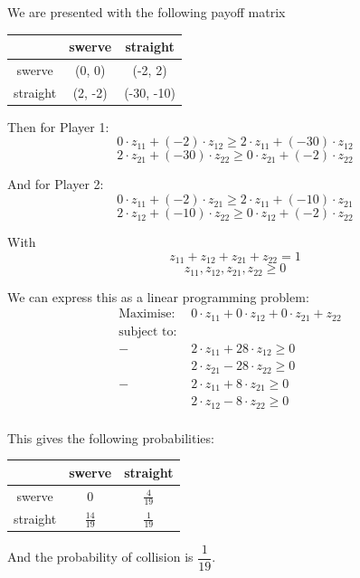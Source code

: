 \documentclass[11pt,journal]{article}
\begin{document}
	We are presented with the following payoff matrix
	\begin{table}[h]
		\centering
		\begin{tabular}{c|c|c|}
			
			& swerve & straight \\
			\hline
			swerve &(0, 0) & (-2, 2) \\
			\hline
			straight & (2, -2) & (-30, -10) \\
			\hline
		\end{tabular}
	\end{table}
	
	Then for Player 1:
	\[0 \cdot z_{11} + (-2)\cdot z_{12} \geq 2\cdot z_{11} + (-30) \cdot z_{12}  \]
	\[ 2 \cdot z_{21} + (-30) \cdot z_{22} \geq 0 \cdot z_{21} + (-2) \cdot z_{22}  \]
	
	And for Player 2:
	\[ 0 \cdot z_{11} + (-2) \cdot z_{21} \geq 2 \cdot z_{11} + (-10) \cdot z_{21}  \]
	\[ 2 \cdot z_{12} + (-10) \cdot z_{22} \geq 0 \cdot z_{12} + (-2) \cdot z_{22} \]
	
	With
	\[ z_{11} + z_{12} + z_{21} + z_{22} =1 \]
	\[ z_{11}, z_{12}, z_{21}, z_{22} \geq 0  \]
	
	We can express this as a linear programming problem:
	\begin{align*}
		\text{Maximise: } & 0\cdot z_{11} + 0 \cdot z_{12} + 0 \cdot z_{21} + z_{22} &\\
		\text{subject to: } & &\\
		 -&2\cdot z_{11} + 28\cdot z_{12} \geq 0\\
		& 2 \cdot z_{21} - 28 \cdot z_{22}  \geq 0\\
		 -&2 \cdot z_{11} + 8 \cdot z_{21} \geq 0\\
		& 2 \cdot z_{12} -8 \cdot z_{22} \geq 0 \\
	\end{align*}
	
	This gives the following probabilities:
	
	\begin{table}[h]
		\centering
		\begin{tabular}{c|c|c|}
			
			& swerve & straight \\
			\hline
			swerve & 0 & $\frac{4}{19}$ \\
			\hline
			straight & $\frac{14}{19}$ & $\frac{1}{19}$ \\
			\hline
		\end{tabular}
	\end{table}
	And the probability of collision is $\dfrac{1}{19}$. 
	
\end{document}

